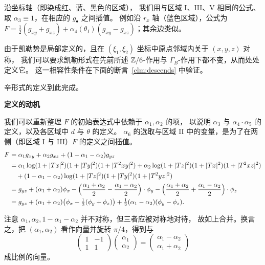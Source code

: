 沿坐标轴（即染成红、蓝、黑色的区域），
我们用与区域 I、III、V 相同的公式、取 $\alpha_3\equiv1$，在相应的 $g_{\bullet}$ 之间插值。
例如沿 $r_x$ 轴（蓝色区域），公式为
$F=\frac12(g_{xy}+g_{xz})+\alpha_4(\theta_I)(g_{xy}-g_{xz})$；其余边类似。


由于凯勒势是局部定义的，且在 $(\xi_1,\xi_2)$ 坐标中原点邻域内关于 $(x,y,z)$ 对称，
我们可以要求凯勒形式在先前所述 $\mathbb{Z}/6$-作用与 $\Gamma_B$-作用下都不变，从而处处定义它。
这一相容性条件在下面的断言~\ref{clm:descends} 中验证。

辛形式的定义到此完成。

\medskip\noindent\textbf{定义的动机}\par

我们可以重新整理 $F$ 的初始表达式中依赖于 $\alpha_1,\alpha_2$ 的项，
以说明 $\alpha_3$ 与 $\alpha_4\cdot\alpha_5$ 的定义，以及各区域中 $d$ 与 $\theta$ 的定义。
$\alpha_6$ 的选取与区域 II 中的变量，是为了在两侧（即区域 I 与 III）$F$ 的定义之间插值。
\begin{align*}
F&=\alpha_1g_{xy}+\alpha_2g_{xz}+(1-\alpha_1-\alpha_2)g_{yz}\\
&=\alpha_1\log(1+|Tx|^2)(1+|Ty|^2)(1+|T^2xy|^2)
+\alpha_2\log(1+|Tz|^2)(1+|Tx|^2)(1+|T^2xz|^2)\\
&\quad+(1-\alpha_1-\alpha_2)\log(1+|Tz|^2)(1+|Ty|^2)(1+|T^2yz|^2)\\
&=g_{yz}+(\alpha_1+\alpha_2)\phi_x
-\Bigl(\frac{\alpha_1+\alpha_2}{2}-\frac{\alpha_1-\alpha_2}{2}\Bigr)\cdot\phi_y
-\Bigl(\frac{\alpha_1+\alpha_2}{2}+\frac{\alpha_1-\alpha_2}{2}\Bigr)\cdot\phi_z\\
&=g_{yz}+(\alpha_1+\alpha_2)\bigl(\phi_x-\tfrac12(\phi_y+\phi_z)\bigr)
+\tfrac12(\alpha_1-\alpha_2)(\phi_y-\phi_z).
\end{align*}

注意 $\alpha_1,\alpha_2,1-\alpha_1-\alpha_2$ 并不对称，但三者应被对称地对待，
故如上合并。换言之，把 $(\alpha_1,\alpha_2)$ 看作向量并旋转 $\pi/4$，得到与
\[
\begin{pmatrix}1&-1\\1&1\end{pmatrix}
\begin{pmatrix}\alpha_1\\\alpha_2\end{pmatrix}
=\begin{pmatrix}\alpha_1-\alpha_2\\\alpha_1+\alpha_2\end{pmatrix}
\]
成比例的向量。

